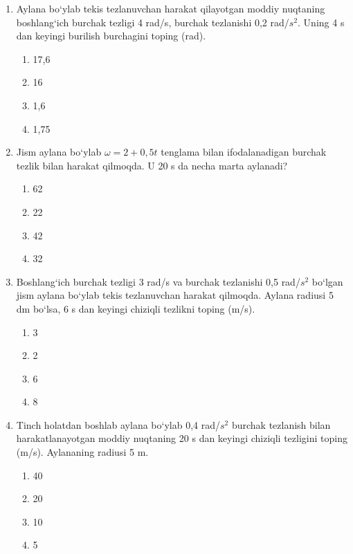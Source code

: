 \begin{enumerate}
\begin{enumerate}[label=\Alph*)]
\end{enumerate}

\item Aylana bo‘ylab tekis tezlanuvchan harakat qilayotgan moddiy nuqtaning boshlang‘ich burchak tezligi 4 rad/s, burchak tezlanishi 0,2 rad/$s^2$. Uning 4 s dan keyingi burilish burchagini toping (rad).
\begin{enumerate}[label=\Alph*)]
\item 17,6
\item 16
\item 1,6
\item 1,75

\end{enumerate}

\item Jism aylana bo‘ylab $\omega = 2 + 0,5t$ tenglama bilan ifodalanadigan burchak tezlik bilan harakat qilmoqda. U 20 s da necha marta aylanadi?
\begin{enumerate}[label=\Alph*)]
\item 62
\item 22
\item 42
\item 32

\end{enumerate}

\item Boshlang‘ich burchak tezligi 3 rad/s va burchak tezlanishi 0,5 rad/$s^2$ bo‘lgan jism aylana bo‘ylab tekis tezlanuvchan harakat qilmoqda. Aylana radiusi 5 dm bo‘lsa, 6 s dan keyingi chiziqli tezlikni toping (m/s).
\begin{enumerate}[label=\Alph*)]
\item 3
\item 2
\item 6
\item 8

\end{enumerate}

\item Tinch holatdan boshlab aylana bo‘ylab 0,4 rad/$s^2$ burchak tezlanish bilan harakatlanayotgan moddiy nuqtaning 20 s dan keyingi chiziqli tezligini toping (m/s). Aylananing radiusi 5 m.
\begin{enumerate}[label=\Alph*)]
\item 40
\item 20
\item 10
\item 5

\end{enumerate}


\end{enumerate}
